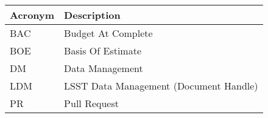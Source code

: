 \addtocounter{table}{-1}
\begin{longtable}{|l|p{}|}\hline
\textbf{Acronym} & \textbf{Description}  \\\hline

BAC & Budget At Complete \\\hline
BOE & Basis Of Estimate \\\hline
DM & Data Management \\\hline
LDM & LSST Data Management (Document Handle) \\\hline
PR & Pull Request \\\hline
\end{longtable}
